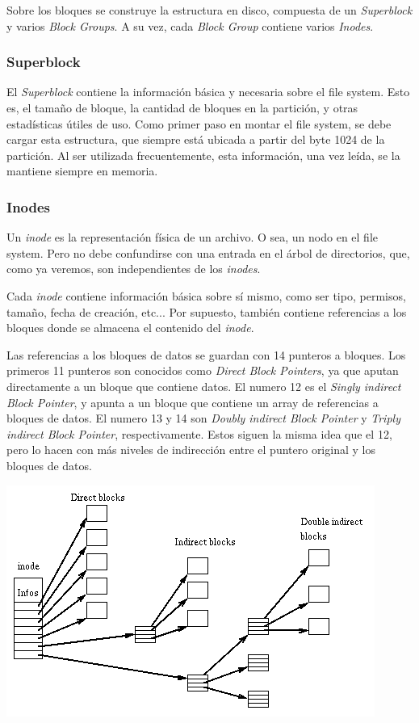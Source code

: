 \documentclass[a4paper,10pt]{article}
\begin{document}
Sobre los bloques se construye la estructura en disco, compuesta de un \textit{Superblock} y varios \textit{Block Groups}.
A su vez, cada \textit{Block Group} contiene varios \textit{Inodes}.

\subsubsection{Superblock}
El \textit{Superblock} contiene la información básica y necesaria sobre el file system.
Esto es, el tamaño de bloque, la cantidad de bloques en la partición, y otras estadísticas útiles de uso.
Como primer paso en montar el file system, se debe cargar esta estructura, que siempre está ubicada a partir del byte 1024 de la partición.
Al ser utilizada frecuentemente, esta información, una vez leída, se la mantiene siempre en memoria.

\subsubsection{Inodes}
Un \textit{inode} es la representación física de un archivo.
O sea, un nodo en el file system.
Pero no debe confundirse con una entrada en el árbol de directorios, que, como ya veremos, son independientes de los \textit{inodes}.

Cada \textit{inode} contiene información básica sobre sí mismo, como ser tipo, permisos, tamaño, fecha de creación, etc...
Por supuesto, también contiene referencias a los bloques donde se almacena el contenido del \textit{inode}.

Las referencias a los bloques de datos se guardan con 14 punteros a bloques.
Los primeros 11 punteros son conocidos como \textit{Direct Block Pointers}, ya que aputan directamente a un bloque que contiene datos.
El numero 12 es el \textit{Singly indirect Block Pointer}, y apunta a un bloque que contiene un array de referencias a bloques de datos.
El numero 13 y 14 son \textit{Doubly indirect Block Pointer} y \textit{Triply indirect Block Pointer}, respectivamente.
Estos siguen la misma idea que el 12, pero lo hacen con más niveles de indirección entre el puntero original y los bloques de datos.

\begin{center}
 \includegraphics{./images/Ext2-inode.png}
\end{center}
\end{document}

